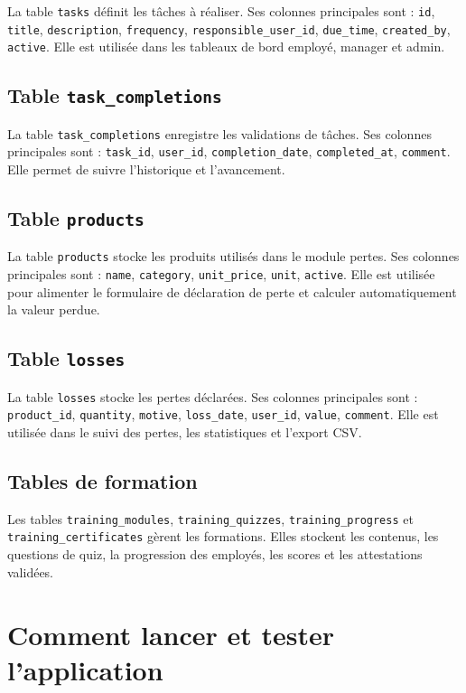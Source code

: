 \documentclass[11pt,a4paper]{article}
\newcommand{\code}[1]{\texttt{#1}}
\begin{document}
La table \code{tasks} définit les tâches à réaliser. Ses colonnes principales sont : \code{id}, \code{title}, \code{description}, \code{frequency}, \code{responsible\_user\_id}, \code{due\_time}, \code{created\_by}, \code{active}. Elle est utilisée dans les tableaux de bord employé, manager et admin.

\subsection{Table \code{task\_completions}}

La table \code{task\_completions} enregistre les validations de tâches. Ses colonnes principales sont : \code{task\_id}, \code{user\_id}, \code{completion\_date}, \code{completed\_at}, \code{comment}. Elle permet de suivre l'historique et l'avancement.

\subsection{Table \code{products}}

La table \code{products} stocke les produits utilisés dans le module pertes. Ses colonnes principales sont : \code{name}, \code{category}, \code{unit\_price}, \code{unit}, \code{active}. Elle est utilisée pour alimenter le formulaire de déclaration de perte et calculer automatiquement la valeur perdue.

\subsection{Table \code{losses}}

La table \code{losses} stocke les pertes déclarées. Ses colonnes principales sont : \code{product\_id}, \code{quantity}, \code{motive}, \code{loss\_date}, \code{user\_id}, \code{value}, \code{comment}. Elle est utilisée dans le suivi des pertes, les statistiques et l'export CSV.

\subsection{Tables de formation}

Les tables \code{training\_modules}, \code{training\_quizzes}, \code{training\_progress} et \code{training\_certificates} gèrent les formations. Elles stockent les contenus, les questions de quiz, la progression des employés, les scores et les attestations validées.

\section{Comment lancer et tester l'application}
\end{document}
